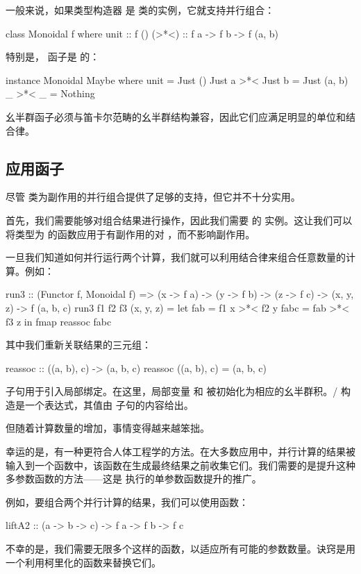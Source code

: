 \documentclass[DaoFP]{subfiles}
\begin{document}
一般来说，如果类型构造器  是  类的实例，它就支持并行组合：
\begin{haskell}
class Monoidal f where
  unit  :: f ()
  (>*<) :: f a -> f b -> f (a, b)
\end{haskell}
特别是， 函子是  的：
\begin{haskell}
instance Monoidal Maybe where
  unit  = Just ()
  Just a >*< Just b = Just (a, b)
  _ >*< _ = Nothing
\end{haskell}
幺半群函子必须与笛卡尔范畴的幺半群结构兼容，因此它们应满足明显的单位和结合律。

\subsection{应用函子}

尽管  类为副作用的并行组合提供了足够的支持，但它并不十分实用。

首先，我们需要能够对组合结果进行操作，因此我们需要  的  实例。这让我们可以将类型为  的函数应用于有副作用的对 ，而不影响副作用。

一旦我们知道如何并行运行两个计算，我们就可以利用结合律来组合任意数量的计算。例如：
\begin{haskell}
run3 :: (Functor f, Monoidal f) => 
  (x -> f a) -> (y -> f b) -> (z -> f c) -> 
  (x, y, z) -> f (a, b, c)
run3 f1 f2 f3 (x, y, z) =
  let fab  = f1 x >*< f2 y
      fabc = fab >*< f3 z
  in fmap reassoc fabc
\end{haskell}
其中我们重新关联结果的三元组：
\begin{haskell}
reassoc :: ((a, b), c) -> (a, b, c)
reassoc ((a, b), c) = (a, b, c)
\end{haskell}
 子句用于引入局部绑定。在这里，局部变量  和  被初始化为相应的幺半群积。/ 构造是一个表达式，其值由  子句的内容给出。

但随着计算数量的增加，事情变得越来越笨拙。

幸运的是，有一种更符合人体工程学的方法。在大多数应用中，并行计算的结果被输入到一个函数中，该函数在生成最终结果之前收集它们。我们需要的是提升这种多参数函数的方法——这是  执行的单参数函数提升的推广。

例如，要组合两个并行计算的结果，我们可以使用函数：
\begin{haskell}
liftA2 :: (a -> b -> c) -> f a -> f b -> f c
\end{haskell}
不幸的是，我们需要无限多个这样的函数，以适应所有可能的参数数量。诀窍是用一个利用柯里化的函数来替换它们。
\end{document}
